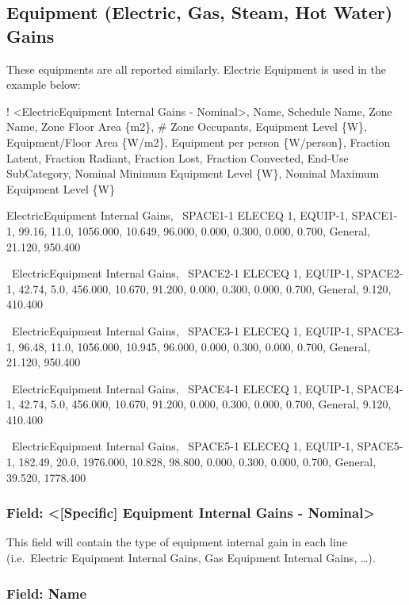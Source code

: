 \subsection{Equipment (Electric, Gas, Steam, Hot Water) Gains}\label{equipment-electric-gas-steam-hot-water-gains}

These equipments are all reported similarly. Electric Equipment is used in the example below:

! \textless{}ElectricEquipment Internal Gains - Nominal\textgreater{}, Name, Schedule Name, Zone Name, Zone Floor Area \{m2\}, \# Zone Occupants, Equipment Level \{W\}, Equipment/Floor Area \{W/m2\}, Equipment per person \{W/person\}, Fraction Latent, Fraction Radiant, Fraction Lost, Fraction Convected, End-Use SubCategory, Nominal Minimum Equipment Level \{W\}, Nominal Maximum Equipment Level \{W\}

ElectricEquipment Internal Gains,~ SPACE1-1 ELECEQ 1, EQUIP-1, SPACE1-1, 99.16, 11.0, 1056.000, 10.649, 96.000, 0.000, 0.300, 0.000, 0.700, General, 21.120, 950.400

~ElectricEquipment Internal Gains,~ SPACE2-1 ELECEQ 1, EQUIP-1, SPACE2-1, 42.74, 5.0, 456.000, 10.670, 91.200, 0.000, 0.300, 0.000, 0.700, General, 9.120, 410.400

~ElectricEquipment Internal Gains,~ SPACE3-1 ELECEQ 1, EQUIP-1, SPACE3-1, 96.48, 11.0, 1056.000, 10.945, 96.000, 0.000, 0.300, 0.000, 0.700, General, 21.120, 950.400

~ElectricEquipment Internal Gains,~ SPACE4-1 ELECEQ 1, EQUIP-1, SPACE4-1, 42.74, 5.0, 456.000, 10.670, 91.200, 0.000, 0.300, 0.000, 0.700, General, 9.120, 410.400

~ElectricEquipment Internal Gains,~ SPACE5-1 ELECEQ 1, EQUIP-1, SPACE5-1, 182.49, 20.0, 1976.000, 10.828, 98.800, 0.000, 0.300, 0.000, 0.700, General, 39.520, 1778.400

\subsubsection{Field: \textless{}{[}Specific{]} Equipment Internal Gains - Nominal\textgreater{}}\label{field-specific-equipment-internal-gains---nominal}

This field will contain the type of equipment internal gain in each line (i.e.~Electric Equipment Internal Gains, Gas Equipment Internal Gains, \ldots{}).

\subsubsection{Field: Name}\label{field-name-3}


